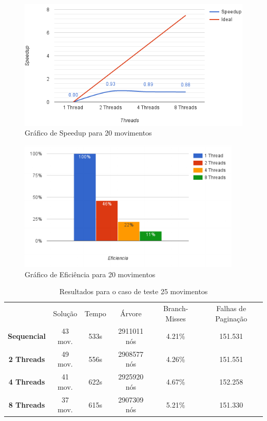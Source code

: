 \documentclass[12pt]{article}
\begin{document}
\begin{figure}[!ht]
\centering
\includegraphics[width=1\textwidth]{speedup20.png}
\caption{Gráfico de Speedup para 20 movimentos}
\label{fig:figura5}
\end{figure}

\begin{figure}[!ht]
\centering
\includegraphics[width=0.95\textwidth]{efic20.png}
\caption{Gráfico de Eficiência para 20 movimentos}
\label{fig:figura6}
\end{figure}


\begin{table}[!ht]
\centering
\caption{Resultados para o caso de teste 25 movimentos}
\label{tabela3}
\begin{tabular}{cccccc}
                    & Solução & Tempo & Árvore      & Branch-Misses & Falhas de Paginação \\
\textbf{Sequencial} & 43 mov. & 533s  & 2911011 nós & 4.21\%        & 151.531             \\
\textbf{2 Threads}  & 49 mov. & 556s  & 2908577 nós & 4.26\%        & 151.551             \\
\textbf{4 Threads}  & 41 mov. & 622s  & 2925920 nós & 4.67\%        & 152.258             \\
\textbf{8 Threads}  & 37 mov. & 615s  & 2907309 nós & 5.21\%        & 151.330            
\end{tabular}
\end{table}
\end{document}
